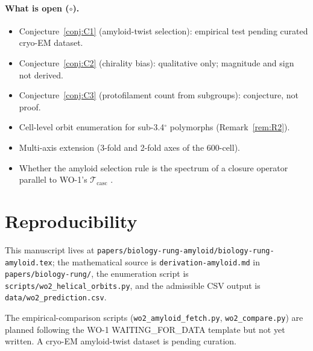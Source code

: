 \documentclass[12pt]{article}
\begin{document}
\paragraph{What is open ($\circ$).}
\begin{itemize}
\item Conjecture~\ref{conj:C1} (amyloid-twist selection):
  empirical test pending curated cryo-EM dataset.
\item Conjecture~\ref{conj:C2} (chirality bias): qualitative
  only; magnitude and sign not derived.
\item Conjecture~\ref{conj:C3} (protofilament count from
  subgroups): conjecture, not proof.
\item Cell-level orbit enumeration for sub-3.4$^{\circ}$
  polymorphs (Remark~\ref{rem:R2}).
\item Multi-axis extension (3-fold and 2-fold axes of the
  600-cell).
\item Whether the amyloid selection rule is the spectrum of a
  closure operator parallel to WO-1's $\mathcal{T}_{\mathrm{casc}}$
  \cite[T.1]{SmartCapsid}.
\end{itemize}

\section{Reproducibility}\label{sec:repro}

This manuscript lives at
\texttt{papers/biology-rung-amyloid/biology-rung-amyloid.tex};
the mathematical source is \texttt{derivation-amyloid.md} in
\texttt{papers/biology-rung/}, the enumeration script is
\texttt{scripts/wo2\_helical\_orbits.py}, and the admissible
CSV output is \texttt{data/wo2\_prediction.csv}.

The empirical-comparison scripts
(\texttt{wo2\_amyloid\_fetch.py},
\texttt{wo2\_compare.py}) are planned following the WO-1
WAITING\_FOR\_DATA template but not yet written. A cryo-EM
amyloid-twist dataset is pending curation.
\end{document}

